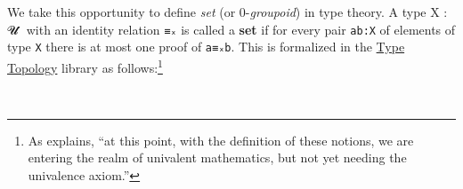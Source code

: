 \begin{code}
We take this opportunity to define \emph{set} (or 0-\emph{groupoid}) in type theory. A type X : 𝓤 ̇ with an identity relation \texttt{≡ₓ} is called a \textbf{set} if for every pair \texttt{ab:X} of elements of type \texttt{X} there is at most one proof of \texttt{a≡ₓb}. This is formalized in the \href{}{Type Topology} library as follows:\footnote{As \mhe explains, ``at this point, with the definition of these notions, we are entering the realm of univalent mathematics, but not yet needing the univalence axiom.''}
\ccpad
\begin{code}
\>[0]\AgdaSpace{}%
\AgdaSymbol{:}\AgdaSpace{}%
\AgdaSpace{}%
\AgdaSpace{}%
\AgdaSpace{}%
\AgdaSpace{}%
\<%
\\
\>[0]\AgdaSpace{}%
\AgdaSpace{}%
\AgdaSymbol{=}\AgdaSpace{}%
\AgdaSymbol{(}\AgdaSpace{}%
\AgdaSpace{}%
\AgdaSymbol{:}\AgdaSpace{}%
\AgdaSymbol{)}\AgdaSpace{}%
\AgdaSpace{}%
\AgdaSpace{}%
\AgdaSymbol{(}\AgdaSpace{}%
\AgdaSpace{}%
\AgdaSymbol{)}\<%
\end{code}








\begin{comment}

The main module of a file must have the same name as the file (without the trailing \texttt{.agda} or \texttt{.lagda}, of course). The code inside the main module is not indented. Modules may be declared inside the main module and code inside these submodules must be indented to the same column. As long as the code is indented, Agda considers it part of the submodule. To exit the submodule, we return to nonindented code. So, the general pattern is as follows:

\KeywordTok{module}\NormalTok{ main }\KeywordTok{where}


\end{comment}
\end{code}
